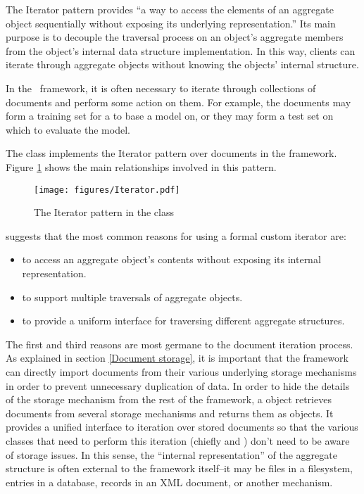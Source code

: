 The Iterator pattern provides ``a way to access the elements of an
aggregate object sequentially without exposing its underlying
representation.'' \cite[p. 257]{gamma:95} Its main purpose is to
decouple the traversal process on an object's aggregate members from
the object's internal data structure implementation.  In this way,
clients can iterate through aggregate objects without knowing the
objects' internal structure.

In the \aicat\ framework, it is often necessary to iterate
through collections of documents and perform some action on them.  For
example, the documents may form a training set for a  to base a
model on, or they may form a test set on which to evaluate the model.

The  class implements the Iterator pattern
\cite[p. 257]{gamma:95} over documents in the framework.  Figure
\ref{Iterator-collection} shows the main relationships involved in
this pattern.

\begin{figure}
\texttt{[image: figures/Iterator.pdf]}
\caption{The Iterator pattern in the  class}
\label{Iterator-collection}
\end{figure}


\cite[p. 259]{gamma:95} suggests that the most common reasons for
using a formal custom iterator are:

\begin{itemize}

\item to access an aggregate object's contents without exposing its
internal representation.

\item to support multiple traversals of aggregate objects.

\item to provide a uniform interface for traversing different
aggregate structures.

\end{itemize}

The first and third reasons are most germane to the document iteration
process.  As explained in section \ref{Document storage}, it is
important that the framework can directly import documents from their
various underlying storage mechanisms in order to prevent unnecessary
duplication of data.  In order to hide the details of the storage
mechanism from the rest of the framework, a  object
retrieves documents from several storage mechanisms and returns them
as  objects.  It provides a unified interface to iteration
over stored documents so that the various classes that need to perform
this iteration (chiefly  and ) don't need to be
aware of storage issues.  In this sense, the ``internal
representation'' of the aggregate structure is often external to the
framework itself--it may be files in a filesystem, entries in a
database, records in an XML document, or another mechanism.

